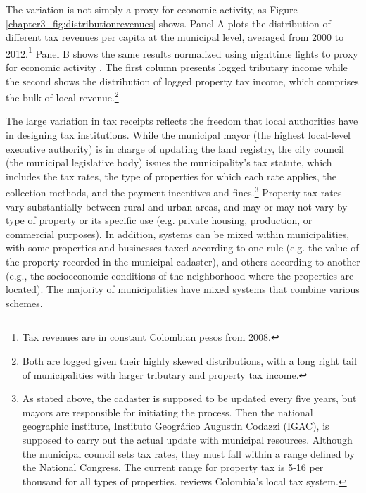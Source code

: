 The variation is not simply a proxy for economic activity, as Figure \ref{chapter3_fig:distributionrevenues} shows. Panel A plots the distribution of different tax revenues per capita at the municipal level, averaged from 2000 to 2012.\footnote{Tax revenues are in constant Colombian pesos from 2008.} Panel B shows the same results normalized using nighttime lights to proxy for economic activity \citep{vernon11}. The first column presents logged tributary income while the second shows the distribution of logged property tax income, which comprises the bulk of local revenue.\footnote{Both are logged given their highly skewed distributions, with a long right tail of municipalities with larger tributary and property tax income.} 

The large variation in tax receipts reflects the freedom that local authorities have in designing tax institutions. While the municipal mayor (the highest local-level executive authority) is in charge of updating the land registry, the city council (the municipal legislative body) issues the municipality's tax statute, which includes the tax rates, the type of properties for which each rate applies, the collection methods, and the payment incentives and fines.\footnote{As stated above, the cadaster is supposed to be updated every five years, but mayors are responsible for initiating the process. Then the national geographic institute, Instituto Geogr\'afico August\'in Codazzi (IGAC), is supposed to carry out the actual update with municipal resources. Although the municipal council sets tax rates, they must fall within a range defined by the National Congress. The current range for property tax is 5-16 per thousand for all types of properties. \citet{nunez05a} reviews Colombia's local tax system.} Property tax rates vary substantially between rural and urban areas, and may or may not vary by type of property or its specific use (e.g. private housing, production, or commercial purposes). In addition, systems can be mixed within municipalities, with some properties and businesses taxed according to one rule (e.g. the value of the property recorded in the municipal cadaster), and others according to another (e.g., the socioeconomic conditions of the neighborhood where the properties are located). The majority of municipalities have mixed systems that combine various schemes.

